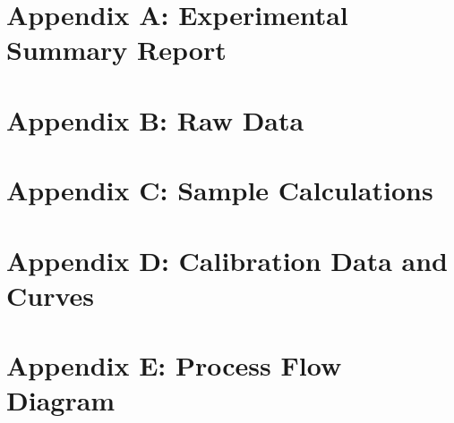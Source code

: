 \documentclass[../main.tex]{subfiles}
\begin{document}
\section{Appendix A: Experimental Summary Report}

\clearpage

\section{Appendix B: Raw Data}

\clearpage

\section{Appendix C: Sample Calculations}

\clearpage

\section{Appendix D: Calibration Data and Curves}

\clearpage

\section{Appendix E: Process Flow Diagram}
\end{document}
